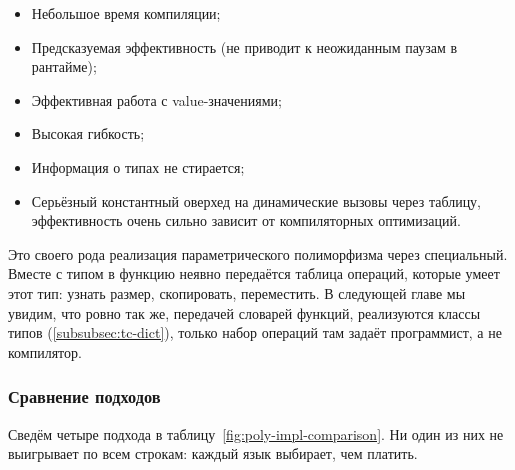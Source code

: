 \begin{itemize}
    \item[\positive] Небольшое время компиляции;
    \item[\positive] Предсказуемая эффективность (не приводит к неожиданным паузам в рантайме);
    \item[\positive] Эффективная работа с value-значениями;
    \item[\positive] Высокая гибкость;
    \item[\positive] Информация о типах не стирается;
    \item[\negative] Серьёзный константный оверхед на динамические вызовы через таблицу, эффективность очень сильно зависит от компиляторных оптимизаций.
\end{itemize}

Это своего рода реализация параметрического полиморфизма через специальный.
Вместе с типом в функцию неявно передаётся таблица операций, которые умеет этот тип: узнать размер, скопировать, переместить.
В следующей главе мы увидим, что ровно так же, передачей словарей функций, реализуются классы типов (\ref{subsubsec:tc-dict}), только набор операций там задаёт программист, а не компилятор.

\subsubsection{Сравнение подходов} \label{subsubsec:poly-impl-comparison}

Сведём четыре подхода в таблицу~\ref{fig:poly-impl-comparison}.
Ни один из них не выигрывает по всем строкам: каждый язык выбирает, чем платить.

